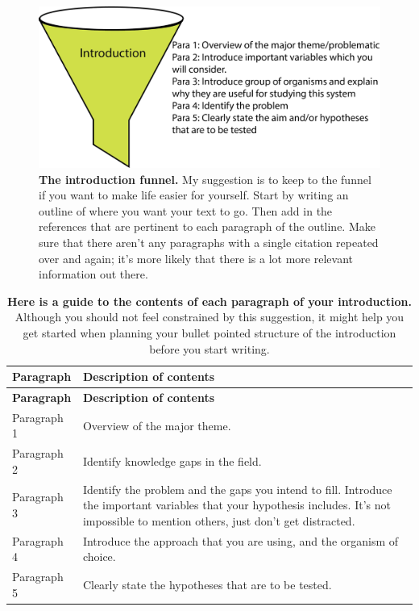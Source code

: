 \documentclass[
]{krantz}
\begin{document}
\begin{figure}
\includegraphics[width=0.95\linewidth]{figures/introduction} \caption{\textbf{The introduction funnel.} My suggestion is to keep to the funnel if you want to make life easier for yourself. Start by writing an outline of where you want your text to go. Then add in the references that are pertinent to each paragraph of the outline. Make sure that there aren't any paragraphs with a single citation repeated over and again; it's more likely that there is a lot more relevant information out there.}\label{fig:introduction}
\end{figure}

\begin{longtable}[]{@{}
  >{\raggedright\arraybackslash}p{}
  >{\raggedright\arraybackslash}p{}@{}}
\caption{\label{tab:introparagraphs} \textbf{Here is a guide to the contents of each paragraph of your introduction.} Although you should not feel constrained by this suggestion, it might help you get started when planning your bullet pointed structure of the introduction before you start writing.}\tabularnewline
\toprule
\textbf{Paragraph} & \textbf{Description of contents} \\
\midrule
\endfirsthead
\toprule
\textbf{Paragraph} & \textbf{Description of contents} \\
\midrule
\endhead
Paragraph 1 & Overview of the major theme. \\
Paragraph 2 & Identify knowledge gaps in the field. \\
Paragraph 3 & Identify the problem and the gaps you intend to fill. Introduce the important variables that your hypothesis includes. It's not impossible to mention others, just don't get distracted. \\
Paragraph 4 & Introduce the approach that you are using, and the organism of choice. \\
Paragraph 5 & Clearly state the hypotheses that are to be tested. \\
\bottomrule
\end{longtable}
\end{document}
